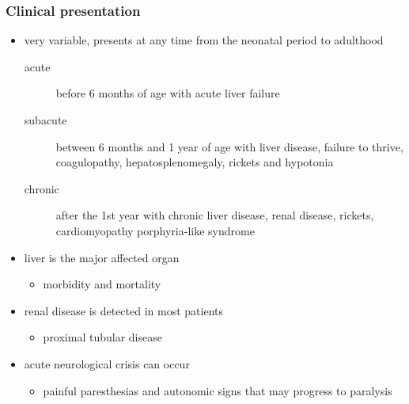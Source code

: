 \documentclass{scrartcl}
\begin{document}
\subsubsection{Clinical presentation}
\label{sec:org41d956c}
\begin{itemize}
\item very variable, presents at any time from the neonatal period to adulthood
\begin{description}
\item[{acute}] before 6 months of age with acute liver failure
\item[{subacute}] between 6 months and 1 year of age with liver disease,
failure to thrive, coagulopathy, hepatosplenomegaly,
rickets and hypotonia
\item[{chronic}] after the 1st year with chronic liver disease, renal
disease, rickets, cardiomyopathy \textpm{} porphyria-like
syndrome
\end{description}

\item liver is the major affected organ
\begin{itemize}
\item morbidity and mortality
\end{itemize}
\item renal disease is detected in most patients
\begin{itemize}
\item proximal tubular disease
\end{itemize}
\item acute neurological crisis can occur
\begin{itemize}
\item painful paresthesias and autonomic signs that may progress to
paralysis
\end{itemize}
\end{itemize}
\end{document}
